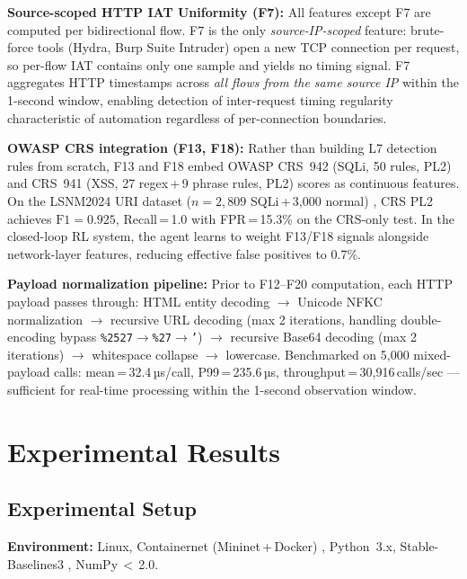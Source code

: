 \documentclass[conference]{IEEEtran}
\begin{document}
\textbf{Source-scoped HTTP IAT Uniformity (F7):} All features except F7
are computed per bidirectional flow. F7 is the only \emph{source-IP-scoped}
feature: brute-force tools (Hydra, Burp Suite Intruder) open a new TCP
connection per request, so per-flow IAT contains only one sample and
yields no timing signal. F7 aggregates HTTP timestamps across \emph{all
flows from the same source IP} within the 1-second window, enabling
detection of inter-request timing regularity characteristic of automation
regardless of per-connection boundaries.

\textbf{OWASP CRS integration (F13, F18):} Rather than building L7 detection
rules from scratch, F13 and F18 embed OWASP CRS~942 (SQLi, 50 rules, PL2)
and CRS~941 (XSS, 27 regex\,+\,9 phrase rules, PL2) scores as continuous
features. On the LSNM2024 URI dataset ($n{=}2{,}809$ SQLi\,+\,3{,}000
normal) \cite{lashkari2024lsnm}, CRS PL2 achieves $\text{F1}{=}0.925$,
Recall\,=\,1.0 with FPR\,=\,15.3\% on the CRS-only test. In the
closed-loop RL system, the agent learns to weight F13/F18 signals
alongside network-layer features, reducing effective false positives
to 0.7\%.

\textbf{Payload normalization pipeline:} Prior to F12--F20 computation, each
HTTP payload passes through: HTML entity decoding $\rightarrow$ Unicode NFKC
normalization $\rightarrow$ recursive URL decoding (max 2 iterations,
handling double-encoding bypass \texttt{\%2527}$\rightarrow$\texttt{\%27}$\rightarrow$\texttt{'}) $\rightarrow$ recursive Base64 decoding (max 2 iterations)
$\rightarrow$ whitespace collapse $\rightarrow$ lowercase.
Benchmarked on 5,000 mixed-payload calls: mean\,=\,32.4\,µs/call,
P99\,=\,235.6\,µs, throughput\,=\,30,916\,calls/sec --- sufficient for
real-time processing within the 1-second observation window.

\section{Experimental Results}

\subsection{Experimental Setup}

\textbf{Environment:} Linux, Containernet (Mininet\,+\,Docker)
\cite{peuster2016containernet}, Python~3.x, Stable-Baselines3
\cite{raffin2021sb3}, NumPy\,$<$\,2.0.
\end{document}
